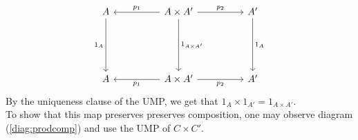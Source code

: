 \begin{equation*} 
	\begin{tikzcd}
	A \arrow[ddd, "1_A"'] &  & A \times A' \arrow[ll, "p_1"'] \arrow[rr, "p_2"] \arrow[ddd, "1_{A \times A'}"] &  & A' \arrow[ddd, "1_A"] \\&&&&\\&&&&\\
	A &  & A\times A' \arrow[ll, "p_1"]\arrow[rr, "p_2"']&&A'                  
	\end{tikzcd}
\end{equation*}	
By the uniqueness clause of the UMP, we get that $1_A \times 1_{A'} = 1_{A\times A'}.$\\
To show that this map preserves preserves composition, one may observe diagram (\ref{diag:prodcomp}) and use the UMP of $C \times C'.$

